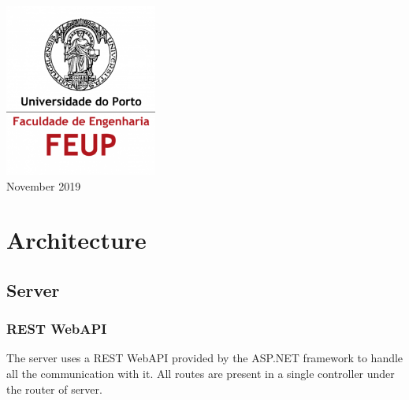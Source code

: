 \documentclass[12pt]{article}
\begin{document}
\begin{titlepage}
\includegraphics[width=50mm,scale=0.5]{feuplogo.png}\\[0.5cm] %





{\large November 2019}\\[2cm] %


\vfill %

\end{titlepage}
\tableofcontents
\pagebreak

\section{Architecture}

\subsection{Server}

\subsubsection{REST WebAPI}
\hspace{0.6cm}
The server uses a REST WebAPI provided by the ASP.NET framework to handle all the communication with it. All routes are present in a single controller under the router of server. 
\end{document}
